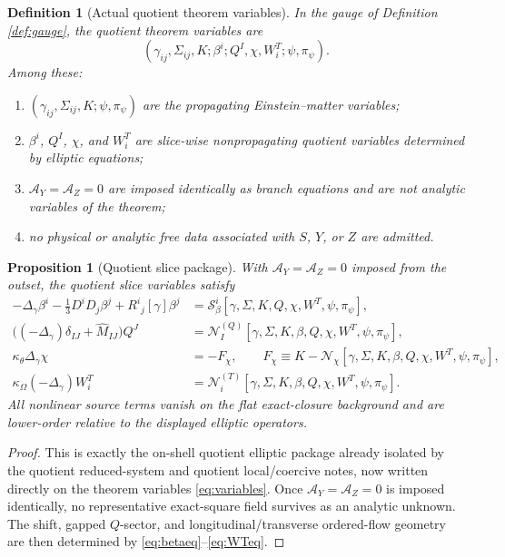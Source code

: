 \documentclass[11pt]{article}
\newcommand{\AY}{\mathcal A_Y}
\newcommand{\AZ}{\mathcal A_Z}
\newtheorem{definition}{Definition}
\newtheorem{proposition}{Proposition}
\begin{document}
\begin{definition}[Actual quotient theorem variables]
\label{def:variables}
In the gauge of Definition \ref{def:gauge}, the quotient theorem variables are
\begin{equation}
(\gamma_{ij},\Sigma_{ij},K;\beta^i;Q^I,\chi,W_i^T;\psi,\pi_\psi).
\label{eq:variables}
\end{equation}
Among these:
\begin{enumerate}
    \item \((\gamma_{ij},\Sigma_{ij},K;\psi,\pi_\psi)\) are the propagating Einstein--matter variables;
    \item \(\beta^i\), \(Q^I\), \(\chi\), and \(W_i^T\) are slice-wise nonpropagating quotient variables determined by elliptic equations;
    \item \(\AY=\AZ=0\) are imposed identically as branch equations and are not analytic variables of the theorem;
    \item no physical or analytic free data associated with \(S\), \(Y\), or \(Z\) are admitted.
\end{enumerate}
\end{definition}

\begin{proposition}[Quotient slice package]
\label{prop:auxpackage}
With \(\AY=\AZ=0\) imposed from the outset, the quotient slice variables satisfy
\begin{align}
-\Delta_\gamma\beta^i
-\frac13D^iD_j\beta^j
+R^i{}_j[\gamma]\beta^j
&=
\mathcal S_\beta^i[\gamma,\Sigma,K,Q,\chi,W^T,\psi,\pi_\psi],
\label{eq:betaeq}
\\
\bigl((-\Delta_\gamma)\delta_{IJ}+\widehat M_{IJ}\bigr)Q^J
&=
\mathcal N_I^{(Q)}[\gamma,\Sigma,K,\beta,Q,\chi,W^T,\psi,\pi_\psi],
\label{eq:Qeq}
\\
\kappa_\theta\Delta_\gamma\chi
&=
-F_\chi,
\qquad
F_\chi
\equiv
K-\mathcal N_\chi[\gamma,\Sigma,K,\beta,Q,\chi,W^T,\psi,\pi_\psi],
\label{eq:chieq}
\\
\kappa_\Omega(-\Delta_\gamma)W_i^T
&=
\mathcal N_i^{(T)}[\gamma,\Sigma,K,\beta,Q,\chi,W^T,\psi,\pi_\psi].
\label{eq:WTeq}
\end{align}
All nonlinear source terms vanish on the flat exact-closure background and are lower-order relative to the displayed elliptic operators.
\end{proposition}

\begin{proof}
This is exactly the on-shell quotient elliptic package already isolated by the quotient reduced-system and quotient local/coercive notes, now written directly on the theorem variables \eqref{eq:variables}. Once \(\AY=\AZ=0\) is imposed identically, no representative exact-square field survives as an analytic unknown. The shift, gapped \(Q\)-sector, and longitudinal/transverse ordered-flow geometry are then determined by \eqref{eq:betaeq}--\eqref{eq:WTeq}.
\end{proof}
\end{document}

